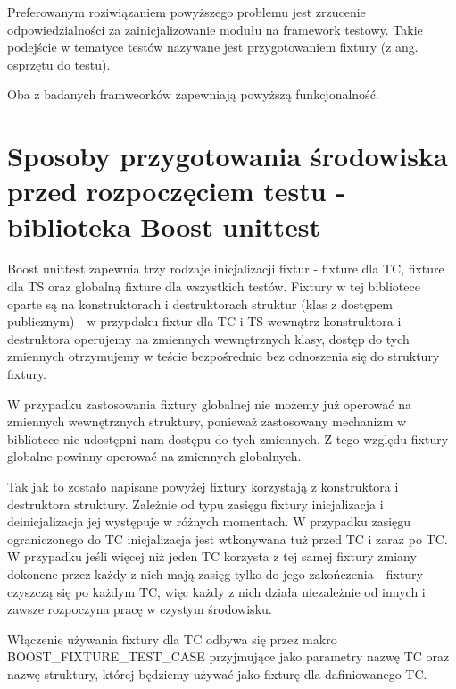 \documentclass[12pt,a4paper,notitlepage]{report}
\begin{document}
Preferowanym roziwiązaniem powyższego problemu jest zrzucenie odpowiedzialności za zainicjalizowanie modułu na framework testowy. Takie podejście w tematyce testów nazywane jest przygotowaniem fixtury (z ang. osprzętu do testu).

Oba z badanych framweorków zapewniają powyższą funkcjonalność.

\section{Sposoby przygotowania środowiska przed rozpoczęciem testu - biblioteka Boost unittest}

Boost unittest zapewnia trzy rodzaje inicjalizacji fixtur - fixture dla TC, fixture dla TS oraz globalną fixture dla wszystkich testów. Fixtury w tej bibliotece oparte są na konstruktorach i destruktorach struktur (klas z dostępem publicznym) - w przypdaku fixtur dla TC i TS wewnątrz konstruktora i destruktora operujemy na zmiennych wewnętrznych klasy, dostęp do tych zmiennych otrzymujemy w teście bezpośrednio bez odnoszenia się do struktury fixtury.

W przypadku zastosowania fixtury globalnej nie możemy już operować na zmiennych wewnętrznych struktury, ponieważ zastosowany mechanizm w bibliotece nie udostępni nam dostępu do tych zmiennych. Z tego względu fixtury globalne powinny operować na zmiennych globalnych.

Tak jak to zostało napisane powyżej fixtury korzystają z konstruktora i destruktora struktury. Zależnie od typu zasięgu fixtury inicjalizacja i deinicjalizacja jej występuje w różnych momentach. W przypadku zasięgu ograniczonego do TC inicjalizacja jest wtkonywana tuż przed TC i zaraz po TC. W przypadku jeśli więcej niż jeden TC korzysta z tej samej fixtury zmiany dokonene przez każdy z nich mają zasięg tylko do jego zakończenia - fixtury czyszczą się po każdym TC, więc każdy z nich działa niezależnie od innych i zawsze rozpoczyna pracę w czystym środowisku.

Włączenie używania fixtury dla TC odbywa się przez makro BOOST{\_}FIXTURE{\_}TEST{\_}CASE przyjmujące jako parametry nazwę TC oraz nazwę struktury, której będziemy używać jako fixturę dla dafiniowanego TC.

			
\end{document}
